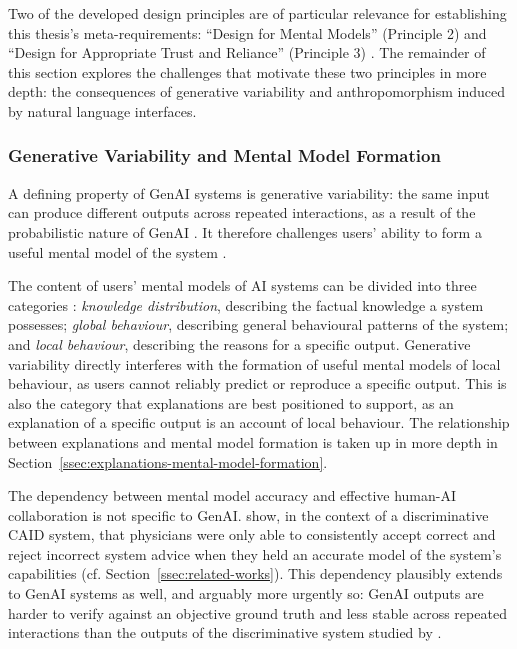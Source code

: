 Two of the developed design principles are of particular relevance for establishing this thesis's meta-requirements: \enquote{Design for Mental Models} (Principle 2) and \enquote{Design for Appropriate Trust and Reliance} (Principle 3) \parencite{Weisz2025}. The remainder of this section explores the challenges that motivate these two principles in more depth: the consequences of generative variability and anthropomorphism induced by natural language interfaces.

\subsubsection*{Generative Variability and Mental Model Formation}

A defining property of \ac{GenAI} systems is generative variability: the same input can produce different outputs across repeated interactions, as a result of the probabilistic nature of \ac{GenAI} \parencite{Weisz2025}. It therefore challenges users' ability to form a useful mental model of the system \parencite{Weisz2025}.

The content of users' mental models of \ac{AI} systems can be divided into three categories \parencite{Gero2020}: \textit{knowledge distribution}, describing the factual knowledge a system possesses; \textit{global behaviour}, describing general behavioural patterns of the system; and \textit{local behaviour}, describing the reasons for a specific output. Generative variability directly interferes with the formation of useful mental models of local behaviour, as users cannot reliably predict or reproduce a specific output. This is also the category that explanations are best positioned to support, as an explanation of a specific output is an account of local behaviour. The relationship between explanations and mental model formation is taken up in more depth in Section~\ref{ssec:explanations-mental-model-formation}.

The dependency between mental model accuracy and effective human-\ac{AI} collaboration is not specific to \ac{GenAI}. \textcite{Jussupow2021} show, in the context of a discriminative \ac{CAID} system, that physicians were only able to consistently accept correct and reject incorrect system advice when they held an accurate model of the system's capabilities (cf. Section~\ref{ssec:related-works}). This dependency plausibly extends to \ac{GenAI} systems as well, and arguably more urgently so: \ac{GenAI} outputs are harder to verify against an objective ground truth and less stable across repeated interactions than the outputs of the discriminative system studied by \textcite{Jussupow2021}.

